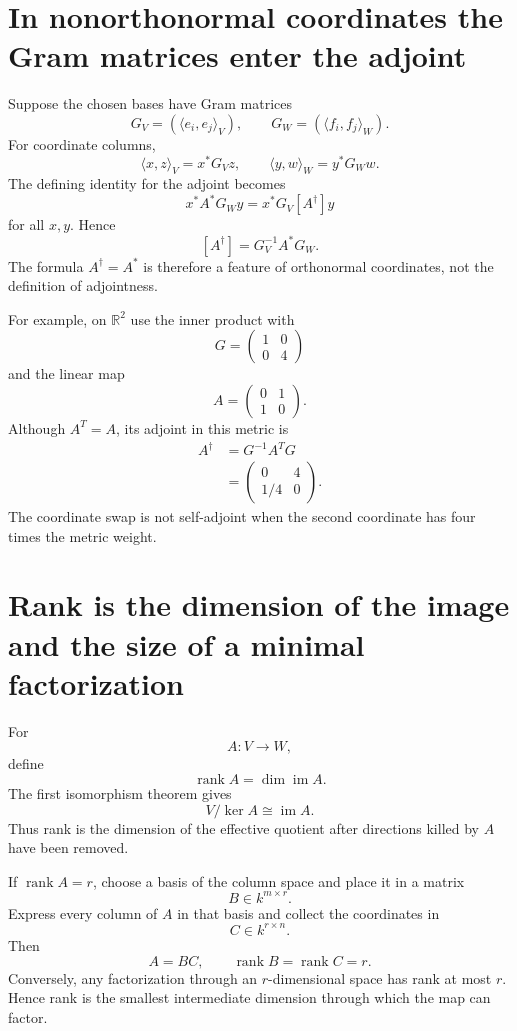 \section{In nonorthonormal coordinates the Gram matrices enter the adjoint}

Suppose the chosen bases have Gram matrices
\[
  G_V=(\langle e_i,e_j\rangle_V),
  \qquad
  G_W=(\langle f_i,f_j\rangle_W).
\]
For coordinate columns,
\[
  \langle x,z\rangle_V=x^*G_Vz,
  \qquad
  \langle y,w\rangle_W=y^*G_Ww.
\]
The defining identity for the adjoint becomes
\[
  x^*A^*G_Wy
  =x^*G_V[A^\dagger]y
\]
for all \(x,y\).  Hence
\[
  \boxed{
  [A^\dagger]
  =G_V^{-1}A^*G_W.}
\]
The formula \(A^\dagger=A^*\) is therefore a feature of orthonormal coordinates, not the definition of adjointness.

For example, on \(\mathbb R^2\) use the inner product with
\[
  G=
  \begin{pmatrix}
    1&0\\
    0&4
  \end{pmatrix}
\]
and the linear map
\[
  A=
  \begin{pmatrix}
    0&1\\
    1&0
  \end{pmatrix}.
\]
Although \(A^T=A\), its adjoint in this metric is
\[
\begin{aligned}
  A^\dagger
  &=G^{-1}A^TG\\
  &=
  \begin{pmatrix}
    0&4\\
    1/4&0
  \end{pmatrix}.
\end{aligned}
\]
The coordinate swap is not self-adjoint when the second coordinate has four times the metric weight.

\section{Rank is the dimension of the image and the size of a minimal factorization}

For
\[
  A:V\to W,
\]
define
\[
  \operatorname{rank}A=\dim\operatorname{im}A.
\]
The first isomorphism theorem gives
\[
  V/\ker A\cong\operatorname{im}A.
\]
Thus rank is the dimension of the effective quotient after directions killed by \(A\) have been removed.

If \(\operatorname{rank}A=r\), choose a basis of the column space and place it in a matrix
\[
  B\in k^{m\times r}.
\]
Express every column of \(A\) in that basis and collect the coordinates in
\[
  C\in k^{r\times n}.
\]
Then
\[
  A=BC,
  \qquad
  \operatorname{rank}B
  =\operatorname{rank}C=r.
\]
Conversely, any factorization through an \(r\)-dimensional space has rank at most \(r\).  Hence rank is the smallest intermediate dimension through which the map can factor.

